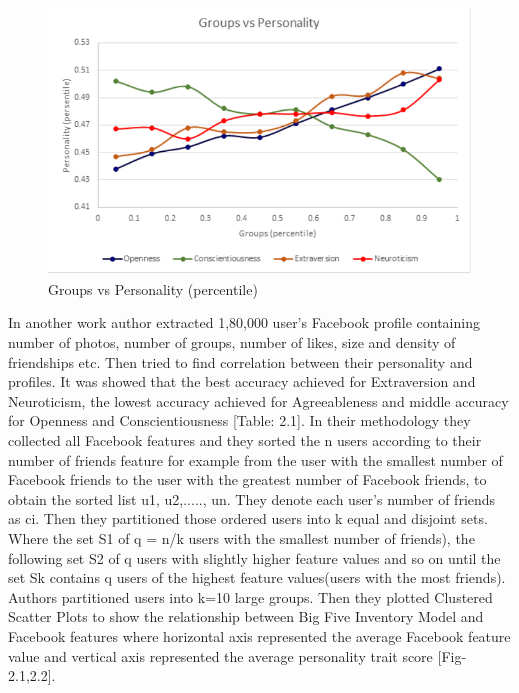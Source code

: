 \documentclass{standalone}
\begin{document}
\begin{figure}[h]
				\centering
				\includegraphics[scale=0.6]{./img/groupvsper}
				\caption{Groups vs Personality (percentile)} \label{fig:mapComp}
\end{figure}

In another work author extracted 1,80,000 user’s Facebook profile containing number of photos, number of groups, number of likes, size and density of friendships etc. Then tried to find correlation between their personality and profiles. It was showed that the best accuracy achieved for Extraversion and Neuroticism, the lowest accuracy achieved for Agreeableness and middle accuracy for Openness and Conscientiousness [Table: 2.1]. In their methodology they collected all Facebook features and they sorted the n users according to their number of friends feature for example from the user with the smallest number of Facebook friends to the user with the greatest number of Facebook friends, to obtain the sorted list u1, u2,....., un. They denote each user’s number of friends as ci. Then they partitioned those ordered users into k equal and disjoint sets. Where the set S1 of q = n/k users with the smallest number of friends), the following set S2 of q users with slightly higher feature values and so on until the set Sk contains q users of the highest feature values(users with the most friends). Authors partitioned users into k=10 large groups. Then they plotted Clustered Scatter Plots to show the relationship between Big Five Inventory Model and Facebook features where horizontal axis represented the average Facebook feature value and vertical axis represented the average personality trait score [Fig-2.1,2.2].
\end{document}
